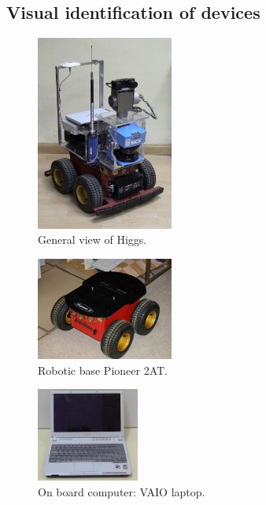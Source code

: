\subsection{Visual identification of devices}


\begin{figure}[ht]
\centering
 \includegraphics[width=0.4\textwidth]{figures/device_photos/higgs.jpg}
\caption{General view of Higgs.}
\end{figure}

\begin{figure}[ht]
\centering
 \includegraphics[width=0.4\textwidth]{figures/device_photos/p2at.jpg}
\caption{Robotic base Pioneer 2AT.}
\end{figure}

\begin{figure}[ht]
\centering
 \includegraphics[width=0.3\textwidth]{figures/device_photos/vaio.jpg}
\caption{On board computer: VAIO laptop.}
\end{figure}

